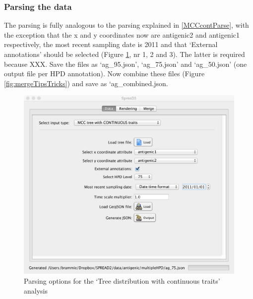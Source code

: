 \documentclass[english]{paper}
\begin{document}
\subsubsection{Parsing the data}

The parsing is fully analogous to the parsing explained in \ref{MCCcontParse}, with the exception that the x and y coordinates now are antigenic2 and antigenic1 respectively, the most recent sampling date is 2011 and that `External annotations' should be selected (Figure \ref{fig:parseTipsTricks}, nr 1, 2 and 3). 
The latter is required because XXX.
Save the files as `ag\_95.json', `ag\_75.json' and `ag\_50.json' (one output file per HPD annotation). 
Now combine these files (Figure \ref{fig:mergeTipsTricks}) and save as `ag\_combined.json.

\begin{figure}[!H]
\centering
\includegraphics[width=1\textwidth]{./figures/parseAG.pdf} 
\caption{Parsing options for the `Tree distribution with continuous traits' analysis}
\label{fig:parseTipsTricks}
\end{figure}
\end{document}
